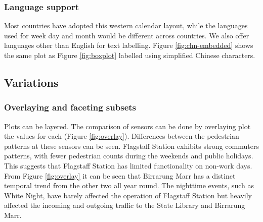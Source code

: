 \documentclass[12pt]{article}
\begin{document}
\hypertarget{language-support}{%
\subsubsection{Language support}\label{language-support}}

Most countries have adopted this western calendar layout, while the
languages used for week day and month would be different across
countries. We also offer languages other than English for text
labelling. Figure \ref{fig:chn-embedded} shows the same plot as Figure
\ref{fig:boxplot} labelled using simplified Chinese characters.

\hypertarget{variations}{%
\subsection{Variations}\label{variations}}

\label{sec:variations}

\hypertarget{overlaying-and-faceting-subsets}{%
\subsubsection{Overlaying and faceting
subsets}\label{overlaying-and-faceting-subsets}}

Plots can be layered. The comparison of sensors can be done by
overlaying plot the values for each (Figure \ref{fig:overlay}).
Differences between the pedestrian patterns at these sensors can be
seen. Flagstaff Station exhibits strong commuters patterns, with fewer
pedestrian counts during the weekends and public holidays. This suggests
that Flagstaff Station has limited functionality on non-work days. From
Figure \ref{fig:overlay} it can be seen that Birrarung Marr has a
distinct temporal trend from the other two all year round. The nighttime
events, such as White Night, have barely affected the operation of
Flagstaff Station but heavily affected the incoming and outgoing traffic
to the State Library and Birrarung Marr.
\end{document}
